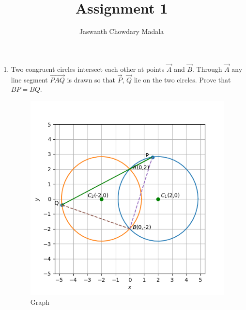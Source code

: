 \documentclass[journal,12pt,twocolumn]{IEEEtran}
\begin{document}
\vspace{3cm}


\title{Assignment 1}
\author{Jaswanth Chowdary Madala}





\maketitle

\newpage


\bigskip

\renewcommand{\thefigure}{\theenumi}
\renewcommand{\thetable}{\theenumi}


\begin{enumerate}
\item Two congruent circles intersect each other at points $\vec{A}$ and $\vec{B}$. Through $\vec{A}$ any line segment $\vec{PAQ}$ is drawn so that $\vec{P}$, $\vec{Q}$ lie on the two circles. Prove that $BP = BQ$.
\begin{figure}[ht]
\centering
\includegraphics[width = \columnwidth]{"./figs/fig.png"}
\caption{Graph}
\label{fig:1}
\end{figure}


\end{enumerate}
\end{document}
